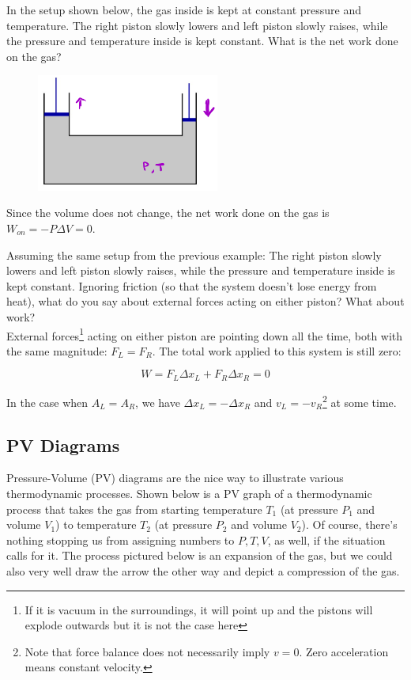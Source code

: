 \documentclass[12pt, a4paper]{article}
\newcounter{exa}
\begin{document}
\begin{texample}
In the setup shown below, the gas inside is kept at constant pressure and temperature. The right piston slowly lowers and left piston slowly raises, while the pressure and temperature inside is kept constant. What is the net work done on the gas? 

\begin{figure}[H]
\centering
\includegraphics[width=60mm]{24.png}
\end{figure}

Since the volume does not change, the net work done on the gas is $W_{on}=-P\Delta V=0$.
\end{texample}

\begin{texample}
Assuming the same setup from the previous example: The right piston slowly lowers and left piston slowly raises, while the pressure and temperature inside is kept constant. Ignoring friction (so that the system doesn't lose energy from heat), what do you say about external forces acting on either piston? What about work? \\

External forces\footnote{If it is vacuum in the surroundings, it will point up and the pistons will explode outwards but it is not the case here} acting on either piston are pointing down all the time, both with the same magnitude: $F_L=F_R$. The total work applied to this system is still zero:

$$W=F_L\Delta x_L +F_R\Delta x_R=0$$

In the case when $A_L=A_R$, we have $\Delta x_L=-\Delta x_R$ and $v_L = -v_R$\footnote{Note that force balance does not necessarily imply $v=0$. Zero acceleration means constant velocity.} at some time.
\end{texample}

\subsection{PV Diagrams}

Pressure-Volume (PV) diagrams are the nice way to illustrate various thermodynamic processes. Shown below is a PV graph of a thermodynamic process that takes the gas from starting temperature $T_1$ (at pressure $P_1$ and volume $V_1$) to temperature $T_2$ (at pressure $P_2$ and volume $V_2$). Of course, there's nothing stopping us from assigning numbers to $P,T,V$, as well, if the situation calls for it. The process pictured below is an expansion of the gas, but we could also very well draw the arrow the other way and depict a compression of the gas. 
\end{document}

